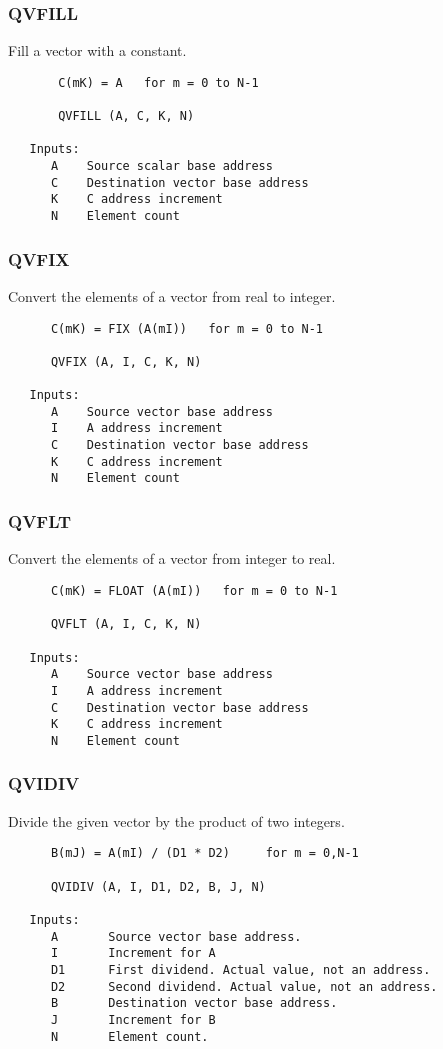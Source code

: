\subsubsection{QVFILL }
Fill a vector with a constant.

\begin{verbatim}
       C(mK) = A   for m = 0 to N-1

       QVFILL (A, C, K, N)

   Inputs:
      A    Source scalar base address
      C    Destination vector base address
      K    C address increment
      N    Element count

\end{verbatim}
\subsubsection{QVFIX }
Convert the elements of a vector from real to integer.

\begin{verbatim}
      C(mK) = FIX (A(mI))   for m = 0 to N-1

      QVFIX (A, I, C, K, N)

   Inputs:
      A    Source vector base address
      I    A address increment
      C    Destination vector base address
      K    C address increment
      N    Element count

\end{verbatim}
\subsubsection{QVFLT }
Convert the elements of a vector from integer to real.

\begin{verbatim}
      C(mK) = FLOAT (A(mI))   for m = 0 to N-1

      QVFLT (A, I, C, K, N)

   Inputs:
      A    Source vector base address
      I    A address increment
      C    Destination vector base address
      K    C address increment
      N    Element count

\end{verbatim}
\subsubsection{QVIDIV }
Divide the given vector by the product of two integers.

\begin{verbatim}
      B(mJ) = A(mI) / (D1 * D2)     for m = 0,N-1

      QVIDIV (A, I, D1, D2, B, J, N)

   Inputs:
      A       Source vector base address.
      I       Increment for A
      D1      First dividend. Actual value, not an address.
      D2      Second dividend. Actual value, not an address.
      B       Destination vector base address.
      J       Increment for B
      N       Element count.
 

\end{verbatim}
